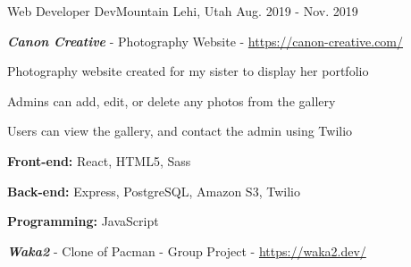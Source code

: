 

\begin{cventries}

  \cventry
    {Web Developer} %
    {DevMountain} %
    {Lehi, Utah} %
    {Aug. 2019 - Nov. 2019} %
    {
      \begin{cvitems} %
        \item{\textbf{\emph{Canon Creative}} - Photography Website - \underline{https://canon-creative.com/}}
        \begin{cvitems}
          \begin{multicols}{2}
            \item {Photography website created for my sister to display her portfolio}
            \item {Admins can add, edit, or delete any photos from the gallery}
            \item {Users can view the gallery, and contact the admin using Twilio}
            \item {\textbf{Front-end:} React, HTML5, Sass}
            \item {\textbf{Back-end:} Express, PostgreSQL, Amazon S3, Twilio}
            \item {\textbf{Programming:} JavaScript}
          \end{multicols}
        \end{cvitems}
        \item {\textbf{\emph{Waka2}} - Clone of Pacman - Group Project - \underline{https://waka2.dev/}}

\end{cvitems}}
\end{cventries}
